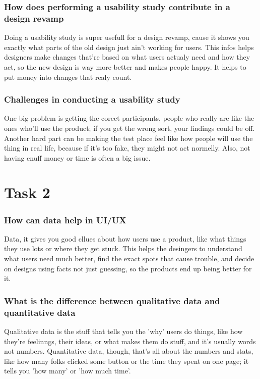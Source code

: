 \documentclass[12pt,a4paper]{article}
\begin{document}
\subsubsection*{How does performing a usability study contribute in a design revamp}
Doing a usability study is super usefull for a design revamp, cause it shows you exactly what parts of the old design just ain't working for users. This infos helps designers make changes that're based on what users actualy need and how they act, so the new design is way more better and makes people happy. It helps to put money into changes that realy count.

\subsubsection*{Challenges in conducting a usability study}
One big problem is getting the corect participants, people who really are like the ones who'll use the product; if you get the wrong sort, your findings could be off. Another hard part can be making the test place feel like how people will use the thing in real life, because if it's too fake, they might not act normelly. Also, not having enuff money or time is often a big issue.

\vspace{1cm}

\section*{Task 2}

\subsubsection*{How can data help in UI/UX}
Data, it gives you good cllues about how users use a product, like what things they use lots or where they get stuck. This helps the desingers to understand what users need much better, find the exact spots that cause trouble, and decide on designs using facts not just guessing, so the products end up being better for it.

\subsubsection*{What is the difference between qualitative data and quantitative data}
Qualitative data is the stuff that tells you the 'why' users do things, like how they're feelinngs, their ideas, or what makes them do stuff, and it's usually words not numbers. Quantitative data, though, that's all about the numbers and stats, like how many folks clicked some button or the time they spent on one page; it tells you 'how many' or 'how much time'.
\end{document}
